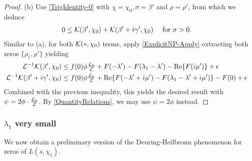 \documentclass[12pt,psamsfonts]{amsart}
\theoremstyle{definition}
\theoremstyle{remark}
\numberwithin{equation}{section}
\begin{document}
\begin{proof}
%
\noindent (b) Use \eqref{TrigIdentity-0} with $\chi = \chi_0, \sigma = \beta'$ and $\rho = \rho'$, from which we deduce
\[
0 \leq \mathcal{K}(\beta', \chi_0) + \mathcal{K}(\beta' + i\gamma', \chi_0) \quad \text{ for } \sigma > 0. 
\]
Similar to (a), for both $\mathcal{K}(\ast, \chi_0)$ terms, apply \cref{ExplicitNP-Apply}
extracting both zeros $\{ \rho_1,\rho' \}$ yielding
\begin{align*}
\mathcal{L}^{-1} \mathcal{K}(\beta', \chi_0)  & \leq  f(0)  \phi \tfrac{\mathcal{L}_0}{\mathcal{L}} + F(-\lambda') - F(\lambda_1-\lambda')  - \mathrm{Re}\{ F(i\mu')\} + \epsilon \\
\mathcal{L}^{-1} \mathcal{K}(\beta'+i\gamma', \chi_0)  & \leq  f(0)  \phi \tfrac{\mathcal{L}_0}{\mathcal{L}}    + \mathrm{Re}\{ F(-\lambda'+i\mu') - F(\lambda_1 - \lambda' + i\mu') \}  - F(0) + \epsilon
\end{align*}
Combined with the previous inequality, this yields the desired result with $\psi = 2\phi \cdot \frac{\mathcal{L}_0}{\mathcal{L}}$. By \cref{QuantityRelations}, we may use $\psi = 2\phi$ instead. \end{proof}

\subsubsection{$\lambda_1$ very small} We now obtain a preliminary version of the Deuring-Heilbronn phenomenon for zeros of $L(s,\chi_1)$. 
\end{document}
